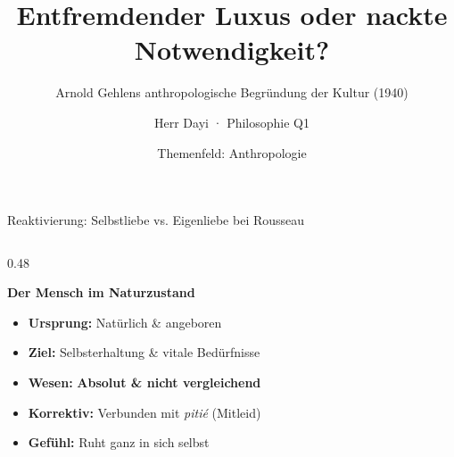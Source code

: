 \documentclass[aspectratio=169, 10pt]{beamer}
\title{Entfremdender Luxus oder nackte Notwendigkeit?}
\subtitle{Arnold Gehlens anthropologische Begründung der Kultur (1940)}
\author{Herr Dayi · Philosophie Q1}
\date{Themenfeld: Anthropologie}
\begin{document}
\begin{frame}[plain]
    \maketitle
\end{frame}

\begin{frame}{Reaktivierung: Selbstliebe vs. Eigenliebe bei Rousseau}
    \vspace{-0.3cm}
    \begin{columns}[T]
        \begin{column}{0.48\textwidth}
            \begin{tcolorbox}[rousseauNature, title={\faLeaf\ amour de soi-même (Selbstliebe)}]
                \textbf{Der Mensch im Naturzustand}
                \begin{itemize}\setlength{\itemsep}{1pt}\footnotesize
                    \item \textbf{Ursprung:} Natürlich \& angeboren
                    \item \textbf{Ziel:} Selbsterhaltung \& vitale Bedürfnisse
                    \item \textbf{Wesen:} \textcolor{accentGreen}{\textbf{Absolut \& nicht vergleichend}}
                    \item \textbf{Korrektiv:} Verbunden mit \textit{pitié} (Mitleid)
                    \item \textbf{Gefühl:} Ruht ganz in sich selbst
                \end{itemize}
            \end{tcolorbox}
        \end{column}


\end{columns}
\end{frame}
\end{document}

